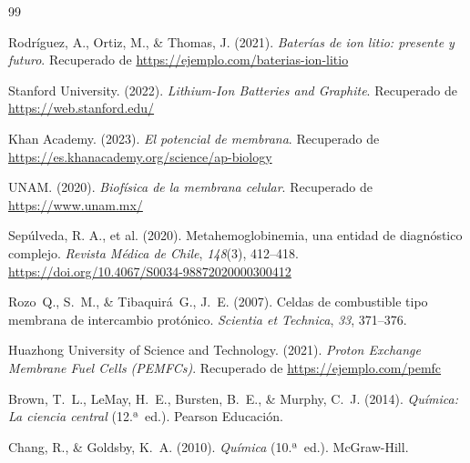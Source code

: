 \documentclass[12pt]{article}
\begin{document}
\begin{thebibliography}{99}

Rodríguez, A., Ortiz, M., \& Thomas, J. (2021).
\textit{Baterías de ion litio: presente y futuro}.
Recuperado de \url{https://ejemplo.com/baterias-ion-litio}

Stanford University. (2022).
\textit{Lithium-Ion Batteries and Graphite}.
Recuperado de \url{https://web.stanford.edu/}

Khan Academy. (2023).
\textit{El potencial de membrana}.
Recuperado de \url{https://es.khanacademy.org/science/ap-biology}

UNAM. (2020).
\textit{Biofísica de la membrana celular}.
Recuperado de \url{https://www.unam.mx/}

Sepúlveda, R. A., et al. (2020).
Metahemoglobinemia, una entidad de diagnóstico complejo.
\textit{Revista Médica de Chile}, \textit{148}(3), 412--418.
\url{https://doi.org/10.4067/S0034-98872020000300412}

Rozo~Q., S.~M., \& Tibaquirá~G., J.~E. (2007).
Celdas de combustible tipo membrana de intercambio protónico.
\textit{Scientia et Technica}, \textit{33}, 371--376.

Huazhong University of Science and Technology. (2021).
\textit{Proton Exchange Membrane Fuel Cells (PEMFCs)}.
Recuperado de \url{https://ejemplo.com/pemfc}

Brown, T.~L., LeMay, H.~E., Bursten, B.~E., \& Murphy, C.~J. (2014).
\textit{Química: La ciencia central} (12.ª~ed.).
Pearson Educación.

Chang, R., \& Goldsby, K.~A. (2010).
\textit{Química} (10.ª~ed.).
McGraw-Hill.

\end{thebibliography}
\end{document}
